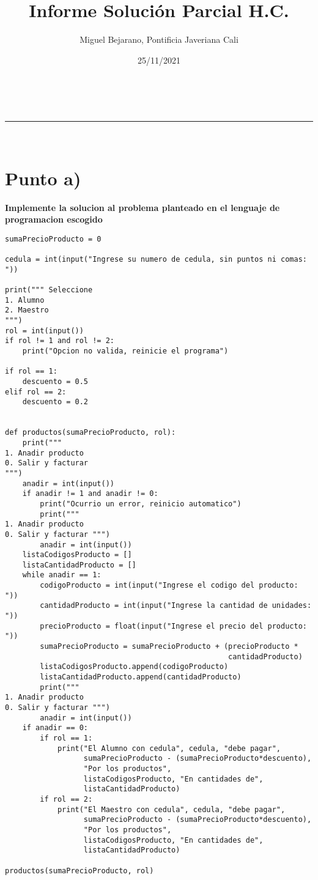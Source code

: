 \documentclass[a4paper,11pt]{article}
\makeatletter
\newcommand{\linia}{\rule{\linewidth}{0.5pt}}
\theoremstyle{mytheor}
\renewcommand{\maketitle}{
\begin{center}
\vspace{2ex}
{\huge \textsc{\@title}}
\vspace{1ex}
\\
\linia\\
\@author \hfill \@date
\vspace{4ex}
\end{center}
}
\makeatother
\begin{document}
\title{Informe Solución Parcial H.C.}

\author{Miguel Bejarano, Pontificia Javeriana Cali}

\date{25/11/2021}

\maketitle

\section*{Punto a)}

\textbf{Implemente la solucion al problema planteado en el lenguaje de programacion
escogido}

\begin{lstlisting}[label={list:1},caption=Solucion del problema en Python]
sumaPrecioProducto = 0

cedula = int(input("Ingrese su numero de cedula, sin puntos ni comas: "))

print(""" Seleccione
1. Alumno
2. Maestro
""")
rol = int(input())
if rol != 1 and rol != 2:
    print("Opcion no valida, reinicie el programa")

if rol == 1:
    descuento = 0.5
elif rol == 2:
    descuento = 0.2


def productos(sumaPrecioProducto, rol):
    print("""
1. Anadir producto
0. Salir y facturar
""")
    anadir = int(input())
    if anadir != 1 and anadir != 0:
        print("Ocurrio un error, reinicio automatico")
        print("""
1. Anadir producto
0. Salir y facturar """)
        anadir = int(input())
    listaCodigosProducto = []
    listaCantidadProducto = []
    while anadir == 1:
        codigoProducto = int(input("Ingrese el codigo del producto: "))
        cantidadProducto = int(input("Ingrese la cantidad de unidades: "))
        precioProducto = float(input("Ingrese el precio del producto: "))
        sumaPrecioProducto = sumaPrecioProducto + (precioProducto *
                                                   cantidadProducto)
        listaCodigosProducto.append(codigoProducto)
        listaCantidadProducto.append(cantidadProducto)
        print("""
1. Anadir producto
0. Salir y facturar """)
        anadir = int(input())
    if anadir == 0:
        if rol == 1:
            print("El Alumno con cedula", cedula, "debe pagar",
                  sumaPrecioProducto - (sumaPrecioProducto*descuento),
                  "Por los productos",
                  listaCodigosProducto, "En cantidades de",
                  listaCantidadProducto)
        if rol == 2:
            print("El Maestro con cedula", cedula, "debe pagar",
                  sumaPrecioProducto - (sumaPrecioProducto*descuento),
                  "Por los productos",
                  listaCodigosProducto, "En cantidades de",
                  listaCantidadProducto)

productos(sumaPrecioProducto, rol)
\end{lstlisting}
\end{document}
